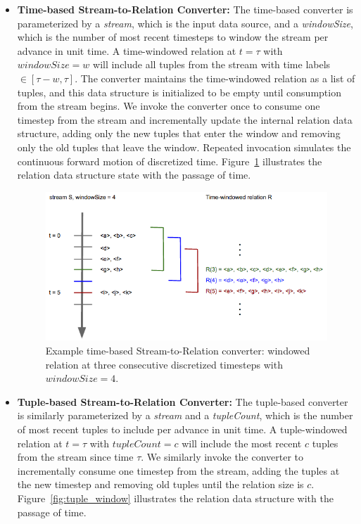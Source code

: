 \documentclass[a4paper, 10pt, conference]{IEEEconf}
\begin{document}
\begin{itemize}

\item \textbf{Time-based Stream-to-Relation Converter:} The time-based converter is parameterized by a \textit{stream}, which is the input data source, and a \textit{windowSize}, which is the number of most recent timesteps to window the stream per advance in unit time. A time-windowed relation at $t = \tau$ with $windowSize = w$ will include all tuples from the stream with time labels $\in [\tau - w, \tau]$. The converter maintains the time-windowed relation as a list of tuples, and this data structure is initialized to be empty until consumption from the stream begins. We invoke the converter once to consume one timestep from the stream and incrementally update the internal relation data structure, adding only the new tuples that enter the window and removing only the old tuples that leave the window. Repeated invocation simulates the continuous forward motion of discretized time. Figure~\ref{fig:time_window} illustrates the relation data structure state with the passage of time. 

\begin{figure}[h!]
    \centering
    \centerline{\includegraphics[totalheight=4cm]{time_window.png}}
    \caption{Example time-based Stream-to-Relation converter: windowed relation at three consecutive discretized timesteps with $windowSize = 4$.}
    \label{fig:time_window}
\end{figure}

\item \textbf{Tuple-based Stream-to-Relation Converter:} The tuple-based converter is similarly parameterized by a \textit{stream} and a \textit{tupleCount}, which is the number of most recent tuples to include per advance in unit time. A tuple-windowed relation at $t = \tau$ with $tupleCount = c$ will include the most recent $c$ tuples from the stream since time $\tau$. We similarly invoke the converter to incrementally consume one timestep from the stream, adding the tuples at the new timestep and removing old tuples until the relation size is $c$. Figure~\ref{fig:tuple_window} illustrates the relation data structure with the passage of time. 


\end{itemize}
\end{document}
